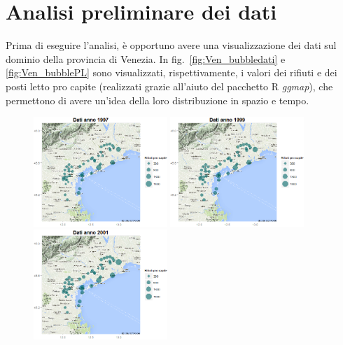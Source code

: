 \documentclass[a4paper,11pt,twoside,openright]{book}							%
\begin{document}
\section{Analisi preliminare dei dati}
Prima di eseguire l'analisi, è opportuno avere una visualizzazione dei dati sul dominio della provincia di Venezia. In fig.~\ref{fig:Ven_bubbledati} e \ref{fig:Ven_bubblePL} sono visualizzati, rispettivamente, i valori dei rifiuti e dei posti letto pro capite (realizzati grazie all'aiuto del pacchetto R \textit{ggmap}), che permettono di avere un'idea della loro distribuzione in spazio e tempo.
\newpage
\begin{figure}[H]
	\centering
	\includegraphics[trim=0cm 0cm 0cm 0cm,clip=true,width=0.45\textwidth]{Immagini/venezia_dati/Dati1997.png}
	\includegraphics[trim=0cm 0cm 0cm 0cm,clip=true,width=0.45\textwidth]{Immagini/venezia_dati/Dati1999.png}
	\includegraphics[trim=0cm 0cm 0cm 0cm,clip=true,width=0.45\textwidth]{Immagini/venezia_dati/Dati2001.png}

\end{figure}
\end{document}

